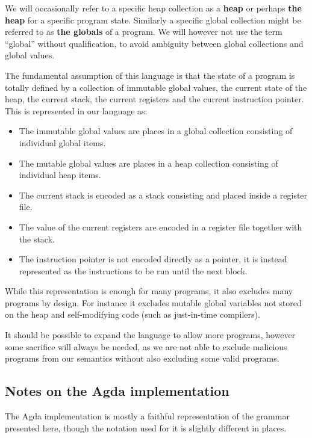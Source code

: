 We will occasionally refer to a specific heap collection as a \textbf{heap} or
perhaps \textbf{the heap} for a specific program state. Similarly a specific
global collection might be referred to as \textbf{the globals} of a program. We
will however not use the term ``global'' without qualification, to avoid
ambiguity between global collections and global values.

The fundamental assumption of this language is that the state of a program is
totally defined by a collection of immutable global values, the current state of
the heap, the current stack, the current registers and the current instruction
pointer. This is represented in our language as:

\begin{itemize}
\item The immutable global values are places in a global collection
  consisting of individual global items.
\item The mutable global values are places in a heap collection
  consisting of individual heap items.
\item The current stack is encoded as a stack consisting and placed inside a
  register file.
\item The value of the current registers are encoded in a register file together
  with the stack.
\item The instruction pointer is not encoded directly as a pointer, it is
  instead represented as the instructions to be run until the next block.
\end{itemize}

While this representation is enough for many programs, it also excludes many
programs by design. For instance it excludes mutable global variables not stored
on the heap and self-modifying code (such as just-in-time compilers).

It should be possible to expand the language to allow more programs, however
some sacrifice will always be needed, as we are not able to exclude malicious
programs from our semantics without also excluding some valid programs.

\subsection{Notes on the Agda implementation}

The Agda implementation is mostly a faithful representation of the grammar
presented here, though the notation used for it is slightly different in places.

